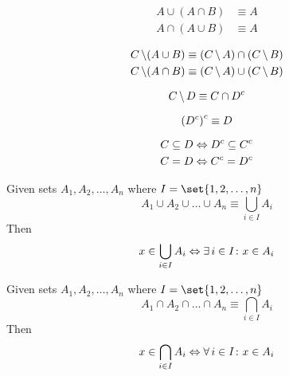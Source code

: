 \begin{definition}
\begin{align}
    A \cup (A \cap B) &\equiv A \\
    A \cap (A \cup B) &\equiv A
\end{align}
\end{definition}

\begin{definition}
\begin{align}
    C \operatorname{\backslash} (A \cup B) &\equiv (C \operatorname{\backslash} A) \cap (C \operatorname{\backslash} B) \\
    C \operatorname{\backslash} (A \cap B) &\equiv (C \operatorname{\backslash} A) \cup (C \operatorname{\backslash} B)
\end{align}
\end{definition}

\begin{definition}
\begin{equation}
    C \operatorname{\backslash} D \equiv C \cap {D}^{c}
\end{equation}
\end{definition}

\begin{definition}
\begin{equation}
    {({D}^{c})}^{c} \equiv D
\end{equation}
\end{definition}

\begin{definition}[Contraposition]
\begin{align}
    C \subseteq D &\Leftrightarrow {D}^{c} \subseteq {C}^{c} \\
    C = D &\Leftrightarrow {C}^{c} = {D}^{c}
\end{align}
\end{definition}

\begin{definition}
    Given sets $A_1, A_2, \dots, A_n$ where $I = \set{1, 2, \dots, n}$
    \begin{equation}
        A_1 \cup A_2 \cup \dots \cup A_n \equiv \bigcup_{i \in I} A_i
    \end{equation}
    Then
    \begin{equation}
        x \in \bigcup_{i \in I} A_i \Leftrightarrow \operatorname{\exists} i \in I \colon x \in A_i
    \end{equation}
\end{definition}

\begin{definition}
    Given sets $A_1, A_2, \dots, A_n$ where $I = \set{1, 2, \dots, n}$
    \begin{equation}
        A_1 \cap A_2 \cap \dots \cap A_n \equiv \bigcap_{i \in I} A_i
    \end{equation}
    Then
    \begin{equation}
        x \in \bigcap_{i \in I} A_i \Leftrightarrow \operatorname{\forall} i \in I \colon x \in A_i
    \end{equation}
\end{definition}